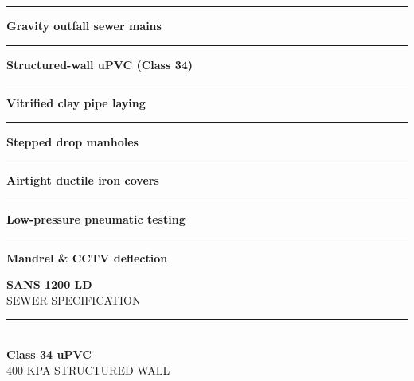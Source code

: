 \begin{minipage}[t]{0.34\textwidth}
    \vspace{0pt}
    \begin{tcolorbox}[
        enhanced, colback=mhoffwhite, colframe=mhnavy, boxrule=1pt, arc=4pt,
        title={\bfseries\color{white}\faWater\ Sewer Scope of Work},
        colbacktitle=mhnavy, left=7pt, right=7pt, top=6pt, bottom=6pt,
        drop shadow=black!6
    ]
        \fontsize{8.1pt}{11.6pt}\selectfont
        \textcolor{mhnavy}{\rule{4pt}{4pt}}\hspace{4pt}\textbf{Gravity outfall sewer mains}\\
        \textcolor{mhnavy}{\rule{4pt}{4pt}}\hspace{4pt}\textbf{Structured-wall uPVC (Class 34)}\\
        \textcolor{mhnavy}{\rule{4pt}{4pt}}\hspace{4pt}\textbf{Vitrified clay pipe laying}\\
        \textcolor{mhnavy}{\rule{4pt}{4pt}}\hspace{4pt}\textbf{Stepped drop manholes}\\
        \textcolor{mhnavy}{\rule{4pt}{4pt}}\hspace{4pt}\textbf{Airtight ductile iron covers}\\
        \textcolor{mhnavy}{\rule{4pt}{4pt}}\hspace{4pt}\textbf{Low-pressure pneumatic testing}\\
        \textcolor{mhnavy}{\rule{4pt}{4pt}}\hspace{4pt}\textbf{Mandrel \& CCTV deflection}
    \end{tcolorbox}

    \vspace{0.20cm}

    \begin{tcolorbox}[
        enhanced, colback=white, colframe=mhlightgray, boxrule=0.8pt, arc=4pt,
        left=6pt, right=6pt, top=6pt, bottom=6pt, halign=center,
        drop shadow=black!4
    ]
        {\fontsize{18pt}{20pt}\selectfont\bfseries\color{mhblue}SANS 1200 LD}\\[1pt]
        {\fontsize{7.4pt}{9pt}\selectfont\color{mhtextmuted}\MakeUppercase{Sewer Specification}}\\[4pt]
        \textcolor{mhlightgray}{\rule{3.2cm}{0.6pt}}\\[4pt]
        {\fontsize{13pt}{15pt}\selectfont\bfseries\color{mhnavy}Class 34 uPVC}\\[1pt]
        {\fontsize{7.2pt}{9pt}\selectfont\color{mhtextmuted}\MakeUppercase{400 kPa Structured Wall}}
    \end{tcolorbox}
\end{minipage}

